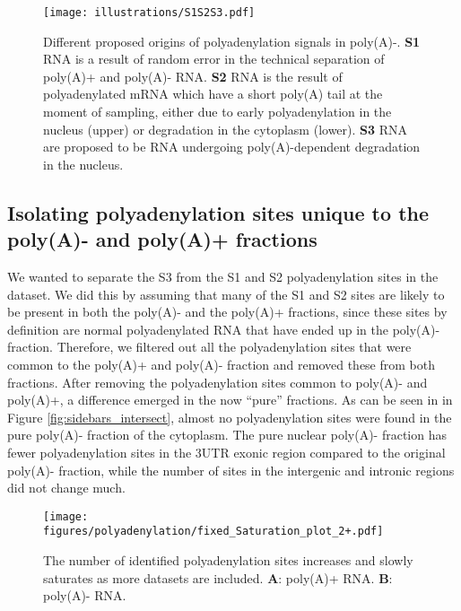 \begin{figure}[hb]
	\begin{center}
		\texttt{[image: illustrations/S1S2S3.pdf]}
	\end{center}
    \caption{Different proposed origins of polyadenylation signals in poly(A)-.
    \textbf{S1} RNA is a result of random error in the technical separation of
    poly(A)+ and poly(A)- RNA. \textbf{S2} RNA is the result of polyadenylated
    mRNA which have a short poly(A) tail at the moment of sampling, either due
    to early polyadenylation in the nucleus (upper) or degradation in the
    cytoplasm (lower). \textbf{S3} RNA are proposed to be RNA undergoing
	poly(A)-dependent degradation in the nucleus.}
	\label{fig:S123}
\end{figure}

\subsection{Isolating polyadenylation sites unique to the poly(A)- and poly(A)+
fractions}
We wanted to separate the S3 from the S1 and S2 polyadenylation sites in the
dataset.  We did this by assuming that many of the S1 and S2 sites are likely
to be present in both the poly(A)- and the poly(A)+ fractions, since these
sites by definition are normal polyadenylated RNA that have ended up in the
poly(A)- fraction. Therefore, we filtered out all the polyadenylation sites
that were common to the poly(A)+ and poly(A)- fraction and removed these from
both fractions. After removing the polyadenylation sites common to poly(A)- and
poly(A)+, a difference emerged in the now ``pure'' fractions. As can be seen in
in Figure \ref{fig:sidebars_intersect}, almost no polyadenylation sites were
found in the pure poly(A)- fraction of the cytoplasm. The pure nuclear poly(A)-
fraction has fewer polyadenylation sites in the 3\ppp UTR exonic region
compared to the original poly(A)- fraction, while the number of sites in the
intergenic and intronic regions did not change much.

\begin{figure}[hb]
	\begin{center}
		\texttt{[image: figures/polyadenylation/fixed\_Saturation\_plot\_2+.pdf]}
	\end{center}
	\caption{The number of identified polyadenylation sites increases and
	slowly saturates as more datasets are included. \textbf{A}: poly(A)+
	RNA. \textbf{B}: poly(A)- RNA.}
	\label{fig:saturation}
\end{figure}


